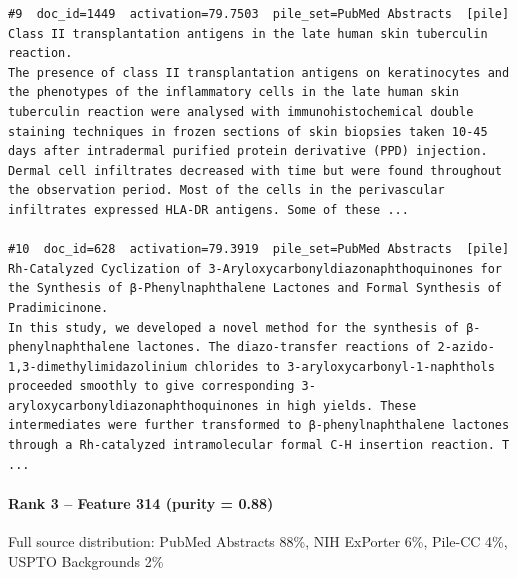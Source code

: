 \begin{verbatim}
#9  doc_id=1449  activation=79.7503  pile_set=PubMed Abstracts  [pile]
Class II transplantation antigens in the late human skin tuberculin reaction.
The presence of class II transplantation antigens on keratinocytes and the phenotypes of the inflammatory cells in the late human skin tuberculin reaction were analysed with immunohistochemical double staining techniques in frozen sections of skin biopsies taken 10-45 days after intradermal purified protein derivative (PPD) injection. Dermal cell infiltrates decreased with time but were found throughout the observation period. Most of the cells in the perivascular infiltrates expressed HLA-DR antigens. Some of these ...

#10  doc_id=628  activation=79.3919  pile_set=PubMed Abstracts  [pile]
Rh-Catalyzed Cyclization of 3-Aryloxycarbonyldiazonaphthoquinones for the Synthesis of β-Phenylnaphthalene Lactones and Formal Synthesis of Pradimicinone.
In this study, we developed a novel method for the synthesis of β-phenylnaphthalene lactones. The diazo-transfer reactions of 2-azido-1,3-dimethylimidazolinium chlorides to 3-aryloxycarbonyl-1-naphthols proceeded smoothly to give corresponding 3-aryloxycarbonyldiazonaphthoquinones in high yields. These intermediates were further transformed to β-phenylnaphthalene lactones through a Rh-catalyzed intramolecular formal C-H insertion reaction. T ...

\end{verbatim}

\paragraph*{Rank 3 -- Feature 314 (purity = 0.88)}

Full source distribution: PubMed Abstracts 88\%, NIH ExPorter 6\%, Pile-CC 4\%, USPTO Backgrounds 2\%

